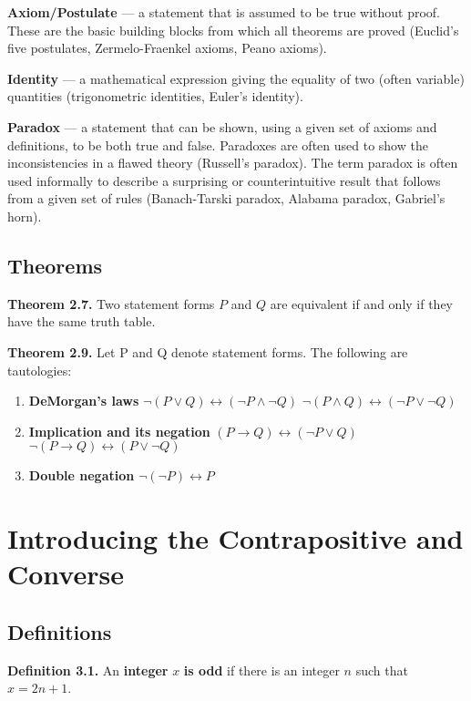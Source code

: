 \documentclass{article}
\begin{document}
\textbf{Axiom/Postulate} — a statement that is assumed to be true without proof. These are the basic building blocks from which all theorems are proved (Euclid’s five postulates, Zermelo-Fraenkel axioms, Peano axioms).

\textbf{Identity} — a mathematical expression giving the equality of two (often variable) quantities (trigonometric identities, Euler’s identity).

\textbf{Paradox} — a statement that can be shown, using a given set of axioms and definitions, to be both true and false. Paradoxes are often used to show the inconsistencies in a flawed theory (Russell’s paradox).  The term paradox is often used informally to describe a surprising or counterintuitive result that follows from a given set of rules (Banach-Tarski paradox, Alabama paradox, Gabriel’s horn).

\subsection{Theorems}
\textbf{Theorem 2.7.} 
Two statement forms $P$ and $Q$ are equivalent if and only if they have the same truth table.

\textbf{Theorem 2.9.}
Let P and Q denote statement forms. The following are tautologies:
\begin{enumerate}
	\item \textbf{DeMorgan's laws}
	\subitem  $\lnot(P \lor Q) \leftrightarrow (\lnot P \land \lnot Q)$
	\subitem  $\lnot(P \land Q) \leftrightarrow (\lnot P \lor \lnot Q)$
	\item \textbf{Implication and its negation}
	\subitem $(P \rightarrow Q) \leftrightarrow (\lnot P \lor Q)$
	\subitem $\lnot(P \rightarrow Q) \leftrightarrow (P \lor \lnot Q)$
	\item \textbf{Double negation}
	\subitem $\lnot(\lnot P) \leftrightarrow P$
\end{enumerate} 


\section{Introducing the Contrapositive and Converse}
\subsection{Definitions}
\textbf{Definition 3.1.} An \textbf{integer} $x$ \textbf{is odd} if there is an integer $n$ such that $x = 2n +1$.
\end{document}
